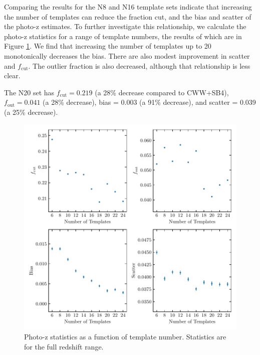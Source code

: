 Comparing the results for the N8 and N16 template sets indicate that increasing the number of templates can reduce the fraction cut, and the bias and scatter of the photo-z estimates.
To further investigate this relationship, we calculate the photo-z statistics for a range of template numbers, the results of which are in Figure \ref{fig:Ntemplates}.
We find that increasing the number of templates up to 20 monotonically decreases the bias.
There are also modest improvement in scatter and $f_\text{cut}$.
The outlier fraction is also decreased, although that relationship is less clear.

The N20 set has $f_\text{cut} = 0.219$ (a 28\% decrease compared to CWW+SB4), $f_\text{out} = 0.041$ (a 28\% decrease), bias = 0.003 (a 91\% decrease), and scatter = 0.039 (a 25\% decrease).

\begin{figure}
    \centering
    \includegraphics{figures/Ntemplates.pdf}
    \caption{Photo-z statistics as a function of template number. Statistics are for the full redshift range.}
    \label{fig:Ntemplates}
\end{figure}

